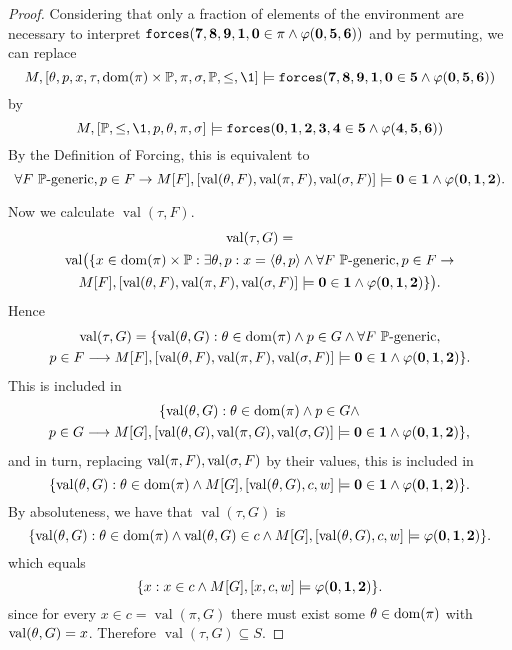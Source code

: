 \documentclass[11pt,english]{article}
\renewcommand{\PP}{\mathbb{P}}
\newcommand{\forceisa}{\mathtt{forces}}
\newcommand{\dB}[1]{\mathbf{#1}}
\DeclareMathOperator{\val}{val}
\begin{document}
\begin{proof}
  Considering that only a fraction of elements
  of the environment  are necessary to interpret
  $\forceisa(\dB{7},\dB{8},\dB{9},\dB{1},\dB{0}\in\pi\y\phi(\dB{0},\dB{5},\dB{6}))$ and by permuting, we can
  replace
  \[
  M, [\th,p,x,\tau,\dom(\pi)\times\PP,\pi,\sig,\PP,\leq,\1]\models
  \forceisa(\dB{7},\dB{8},\dB{9},\dB{1},\dB{0}\in \dB{5} \y\phi(\dB{0},\dB{5},\dB{6}))
  \]
  by
  \[
  M,[\PP,\leq,\1,p,\th,\pi,\sig]\models
  \forceisa(\dB{0},\dB{1},\dB{2},\dB{3},\dB{4}\in \dB{5} \y\phi(\dB{4},\dB{5},\dB{6}))
  \]
  By the Definition of Forcing, this is equivalent to
  \[
  \forall F\ \PP\text{-generic}, p\in F \limp
  M[F],[\val(\th,F),\val(\pi,F),\val(\sig,F)]\models
  \dB{0}\in\dB{1}  \y\phi(\dB{0},\dB{1},\dB{2}).
  \]

  Now we calculate $\val(\tau,F)$.
  \begin{multline*}
    \val(\tau,G) = \\
    \val\bigl(\{x\in\dom(\pi)\times\PP : \exists \th,p : x =\lb\th,p\rb
    \y \forall F\ \PP\text{-generic}, p\in F \limp \\    
    M[F],[\val(\th,F),\val(\pi,F),\val(\sig,F)]\models
    \dB{0}\in \dB{1} \y\phi(\dB{0},\dB{1},\dB{2})\}\bigr).
  \end{multline*}
  Hence
  \begin{multline}\label{eq:val_tau}
    \val(\tau,G) = 
    \{\val(\th,G): \th\in\dom(\pi) \y  p \in G 
    \y \forall F\ \PP\text{-generic}, \\
   p\in F \longrightarrow
  M[F],[\val(\th,F),\val(\pi,F),\val(\sig,F)]\models
  \dB{0}\in \dB{1} \y\phi(\dB{0},\dB{1},\dB{2})\}.
  \end{multline}
  This is included in
  \begin{multline*}
    \{\val(\th,G): \th\in\dom(\pi) \y  p \in G 
    \y  \\
   p\in G \longrightarrow
   M[G],[\val(\th,G),\val(\pi,G),\val(\sig,G)]\models
   \dB{0}\in \dB{1} \y\phi(\dB{0},\dB{1},\dB{2})\},
  \end{multline*}
  and in turn,  replacing $\val(\pi,F),\val(\sig,F)$ by their values,
  this is included  in 
  \[ 
    \{\val(\th,G): \th\in\dom(\pi)
    \y 
   M[G],[\val(\th,G),c,w]\models
   \dB{0}\in \dB{1} \y\phi(\dB{0},\dB{1},\dB{2})\}.
  \]
  By absoluteness, we have that $\val(\tau,G)$ is
  \[
    \{\val(\th,G): \th\in\dom(\pi)
    \y \val(\th,G)\in c \y 
   M[G],[\val(\th,G),c,w]\models
   \phi(\dB{0},\dB{1},\dB{2})\}.
  \]
  which equals 
  \[
    \{x: x\in c \y 
    M[G],[x,c,w]\models
   \phi(\dB{0},\dB{1},\dB{2})\}.
  \]
  since for every $x\in c=\val(\pi,G)$ there must
  exist some $\theta\in\operatorname{dom}(\pi)$ with $\val(\th,G)=x$. Therefore
  $\val(\tau,G)\subseteq S$.


\end{proof}
\end{document}
